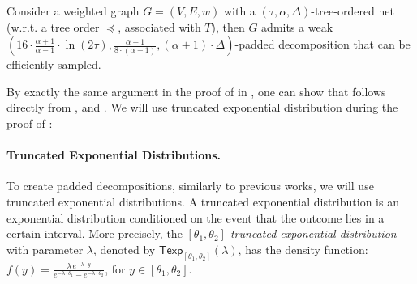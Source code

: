 \documentclass{article}
\newcommand{\Texp}{\mathsf{Texp}}
\begin{document}
\begin{lemma}\label{lem:NetToPadded}
	Consider a weighted graph $G=(V,E,w)$ with a $(\tau,\alpha,\Delta)$-tree-ordered net (w.r.t. a tree order $\preceq$, associated with $T$), then $G$ admits a weak $\left(16\cdot\frac{\alpha+1}{\alpha-1}\cdot\ln(2\tau),\frac{\alpha-1}{8\cdot(\alpha+1)},(\alpha+1)\cdot\Delta\right)$-padded decomposition that can be efficiently sampled.
\end{lemma}



By exactly the same argument in the proof of  in , one can show that    follows directly from ,  and . We will use truncated exponential distribution during the proof of :

\paragraph*{Truncated Exponential Distributions.} To create padded decompositions, similarly to previous works, we will use truncated exponential distributions. A truncated exponential distribution is an exponential distribution conditioned on the event that the outcome lies in a certain interval. More precisely, the \emph{$[\theta_1,\theta_2]$-truncated exponential distribution} with
parameter $\lambda$, denoted by $\Texp_{[\theta_1, \theta_2]}(\lambda)$, has
the density function:
$f(y)= \frac{ \lambda\, e^{-\lambda\cdot y} }{e^{-\lambda \cdot \theta_1} - e^{-\lambda
		\cdot \theta_2}}$, for $y \in [\theta_1, \theta_2]$.
\end{document}
